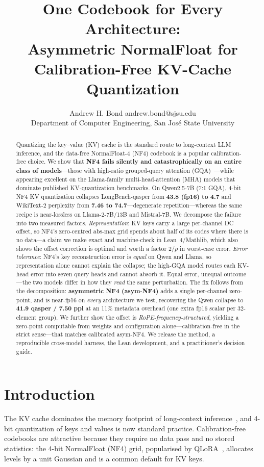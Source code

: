 \documentclass{article}
\title{One Codebook for Every Architecture:\\
       Asymmetric NormalFloat for Calibration-Free KV-Cache Quantization}
\author{\name Andrew H. Bond \email andrew.bond@sjsu.edu \\
  \addr Department of Computer Engineering, San Jos\'e State University}
\theoremstyle{plain}
\theoremstyle{definition}
\begin{document}
\maketitle

\begin{abstract}
Quantizing the key--value (KV) cache is the standard route to long-context LLM inference, and
the data-free NormalFloat-4 (NF4) codebook \citep{dettmers2023qlora} is a popular
calibration-free choice. We show that \textbf{NF4 fails silently and catastrophically on an
entire class of models}---those with high-ratio grouped-query attention
(GQA)~\citep{ainslie2023gqa}---while appearing excellent on the Llama-family
multi-head-attention (MHA) models that dominate published KV-quantization benchmarks. On
Qwen2.5-7B (7:1 GQA), 4-bit NF4 KV quantization collapses LongBench-qasper from \textbf{43.8
(fp16) to 4.7} and WikiText-2 perplexity from \textbf{7.46 to 74.7}---degenerate
repetition---whereas the same recipe is near-lossless on Llama-2-7B/13B and Mistral-7B. We
decompose the failure into two measured factors. \emph{Representation}: KV keys carry a large
per-channel DC offset, so NF4's zero-centred abs-max grid spends about half of its codes where
there is no data---a claim we make exact and machine-check in Lean~4/Mathlib, which also shows
the offset correction is optimal and worth a factor $2/\rho$ in worst-case error. \emph{Error
tolerance}: NF4's key reconstruction error is \emph{equal} on Qwen and Llama, so representation
alone cannot explain the collapse; the high-GQA model routes each KV-head error into seven query
heads and cannot absorb it. Equal error, unequal outcome---the two models differ in how they
\emph{read} the same perturbation. The fix follows from the decomposition: \textbf{asymmetric
NF4 (asym-NF4)} adds a single per-channel zero-point, and is near-fp16 on \emph{every}
architecture we test, recovering the Qwen collapse to \textbf{41.9 qasper / 7.50 ppl} at an
11\% metadata overhead (one extra fp16 scalar per 32-element group). We further show the offset is \emph{RoPE-frequency-structured},
yielding a zero-point computable from weights and configuration alone---calibration-free in the
strict sense---that matches calibrated asym-NF4. We release the method, a reproducible
cross-model harness, the Lean development, and a practitioner's decision guide.
\end{abstract}

\section{Introduction}
The KV cache dominates the memory footprint of long-context inference~\citep{kwon2023vllm}, and
4-bit quantization of keys and values is now standard practice. Calibration-free codebooks are
attractive because they require no data pass and no stored statistics: the 4-bit NormalFloat
(NF4) grid, popularised by QLoRA~\citep{dettmers2023qlora}, allocates levels by a unit Gaussian
and is a common default for KV keys.
\end{document}
